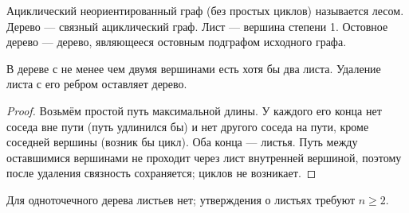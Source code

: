 \begin{definition}
Ациклический неориентированный граф (без простых циклов) называется лесом.
Дерево — связный ациклический граф. Лист — вершина степени 1.
Остовное дерево — дерево, являющееся остовным подграфом исходного графа.
\end{definition}
\begin{lemma}[Листья]
В дереве с не менее чем двумя вершинами есть хотя бы два листа.
Удаление листа с его ребром оставляет дерево.
\end{lemma}
\begin{proof}
Возьмём простой путь максимальной длины. У каждого его конца нет соседа
вне пути (путь удлинился бы) и нет другого соседа на пути, кроме соседней
вершины (возник бы цикл). Оба конца — листья.
Путь между оставшимися вершинами не проходит через лист внутренней
вершиной, поэтому после удаления связность сохраняется; циклов не возникает.
\end{proof}
Для одноточечного дерева листьев нет; утверждения о листьях требуют \(n\ge2\).


